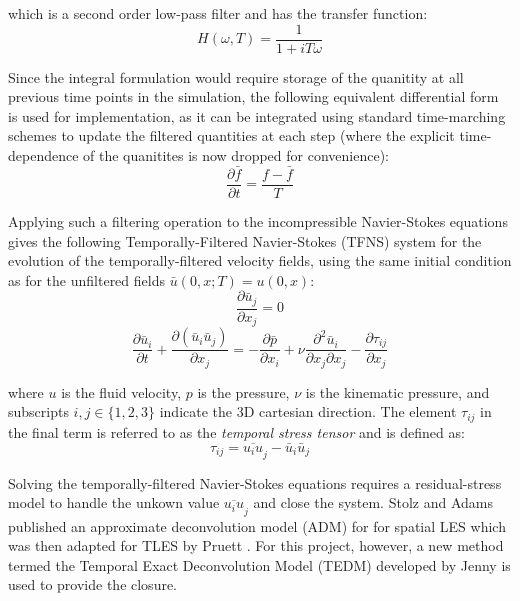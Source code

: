 which is a second order low-pass filter and has the transfer function:
\begin{equation}
H(\omega,T)=\frac{1}{1+iT\omega}
\end{equation}

Since the integral formulation would require storage of the quanitity at all previous time points in the simulation, the following equivalent differential form is used for implementation, as it can be integrated using standard time-marching schemes to update the filtered quantities at each step (where the explicit time-dependence of the quanitites is now dropped for convenience):
\begin{equation} \label{filter_diff}
\frac{\partial \bar{f}}{\partial t}=\frac{f-\bar{f}}{T}
\end{equation}

Applying such a filtering operation to the incompressible Navier-Stokes equations gives the following Temporally-Filtered Navier-Stokes (TFNS) system for the evolution of the temporally-filtered velocity fields, using the same initial condition as for the unfiltered fields $\bar{u}(0,x;T)=u(0,x)$:
\begin{equation} \label{div}
\frac{\partial \bar{u}_j}{\partial x_j}=0
\end{equation}
\begin{equation} \label{TFNS}
\frac{\partial \bar{u}_i}{\partial t}+\frac{\partial (\bar{u}_i\bar{u}_j)}{\partial x_j}=-\frac{\partial \bar{p}}{\partial x_i}+\nu \frac{\partial^2 \bar{u}_i}{\partial x_j \partial x_j}-\frac{\partial \tau_{ij}}{\partial x_j}
\end{equation}

where $u$ is the fluid velocity, $p$ is the pressure, $\nu$ is the kinematic pressure, and subscripts $i,j\in\{1,2,3\}$ indicate the 3D cartesian direction. The element $\tau_{ij}$ in the final term is referred to as the \emph{temporal stress tensor} and is defined as:
\begin{equation}
\tau_{ij}=\overline{u_i u}_j-\bar{u}_i\bar{u}_j
\end{equation}

Solving the temporally-filtered Navier-Stokes equations requires a residual-stress model to handle the unkown value $\overline{u_i u}_j$ and close the system. Stolz and Adams \cite{Stolz2001} published an approximate deconvolution model (ADM) for for spatial LES which was then adapted for TLES by Pruett \cite{Pruett2008}. For this project, however, a new method termed the Temporal Exact Deconvolution Model (TEDM) developed by Jenny \cite{Jenny2016} is used to provide the closure.

